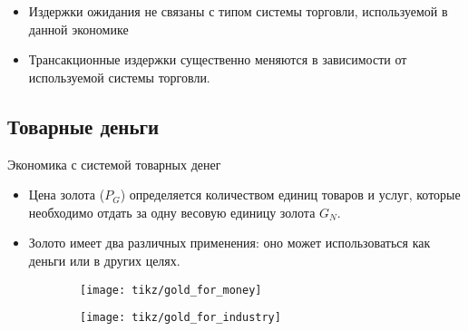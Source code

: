 \documentclass[_DKB_p1_Money.tex]{subfiles}
\begin{document}
\begin{frame}{}
\begin{figure}
	\centering
	\begin{overprint}
	\end{overprint}
	\vspace*{-2em}
	\caption{}
\end{figure}
\vspace*{-2em}
\begin{itemize}
	\small
	\item Издержки ожидания не связаны с типом системы торговли, используемой в данной экономике
	\item Трансакционные издержки существенно меняются в зависимости от используемой системы торговли.
\end{itemize}
\end{frame}


\subsection{Товарные деньги}
\begin{frame}{Экономика с системой товарных денег}
\begin{itemize}
\item
Цена золота ($P_G$) определяется количеством единиц товаров и услуг, которые необходимо отдать за одну весовую единицу золота $G_N$.

\item
Золото имеет два различных применения: оно может использоваться как деньги или в других целях. 
\end{itemize}
\end{frame}

\begin{frame}
\begin{figure}
\center
	\begin{subfigure}[t]{4cm}
		\centering
		\texttt{[image: tikz/gold\_for\_money]}
		\caption{}\label{fig:GD_money}	
	\end{subfigure}
	\quad
	\begin{subfigure}[t]{4cm}
		\centering
		\texttt{[image: tikz/gold\_for\_industry]}
		\caption{}\label{fig:GD_other}
	\end{subfigure}
\caption{}\label{fig:gold_demand}
\end{figure}
\end{frame}
\end{document}
